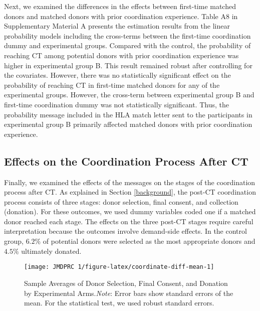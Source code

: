 \documentclass[12pt, a4paper]{article}
\begin{document}
Next, we examined the differences in the effects between first-time matched donors and matched donors with prior coordination experience. Table A8 in Supplementary Material A presents the estimation results from the linear probability models including the cross-terms between the first-time coordination dummy and experimental groups. Compared with the control, the probability of reaching CT among potential donors with prior coordination experience was higher in experimental group B. This result remained robust after controlling for the covariates. However, there was no statistically significant effect on the probability of reaching CT in first-time matched donors for any of the experimental groups. However, the cross-term between experimental group B and first-time coordination dummy was not statistically significant. Thus, the probability message included in the HLA match letter sent to the participants in experimental group B primarily affected matched donors with prior coordination experience.

\hypertarget{process}{%
\subsection{Effects on the Coordination Process After CT}\label{process}}

Finally, we examined the effects of the messages on the stages of the coordination process after CT. As explained in Section \ref{background}, the post-CT coordination process consists of three stages: donor selection, final consent, and collection (donation). For these outcomes, we used dummy variables coded one if a matched donor reached each stage. The effects on the three post-CT stages require careful interpretation because the outcomes involve demand-side effects. In the control group, \(6.2\)\% of potential donors were selected as the most appropriate donors and \(4.5\)\% ultimately donated.

\begin{figure}[t]
\texttt{[image: JMDPRC~1/figure-latex/coordinate-diff-mean-1]} \caption{Sample Averages of Donor Selection, Final Consent, and Donation by Experimental Arms.\newline \emph{Note}: Error bars show standard errors of the mean. For the statistical test, we used robust standard errors.}\label{fig:coordinate-diff-mean}
\end{figure}
\end{document}
